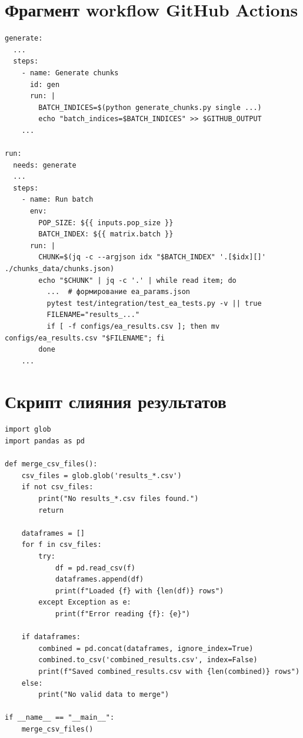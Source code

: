 \documentclass[732]{studrep}
\theoremstyle{nonumberplain}
\begin{document}
\section{Фрагмент workflow GitHub Actions}
\begin{listing}[H]
\begin{verbatim}
generate:
  ...
  steps:
    - name: Generate chunks
      id: gen
      run: |
        BATCH_INDICES=$(python generate_chunks.py single ...)
        echo "batch_indices=$BATCH_INDICES" >> $GITHUB_OUTPUT
    ...

run:
  needs: generate
  ...
  steps:
    - name: Run batch
      env:
        POP_SIZE: ${{ inputs.pop_size }}
        BATCH_INDEX: ${{ matrix.batch }}
      run: |
        CHUNK=$(jq -c --argjson idx "$BATCH_INDEX" '.[$idx][]' ./chunks_data/chunks.json)
        echo "$CHUNK" | jq -c '.' | while read item; do
          ...  # формирование ea_params.json
          pytest test/integration/test_ea_tests.py -v || true
          FILENAME="results_..."
          if [ -f configs/ea_results.csv ]; then mv configs/ea_results.csv "$FILENAME"; fi
        done
    ...
\end{verbatim}
\caption{Фрагмент workflow, реализующий генерацию чанков и параллельное выполнение тестов (стандартные шаги настройки окружения опущены).}
\label{lst:workflow_batch}
\end{listing}

\section{Скрипт слияния результатов}
\begin{listing}[H]
\begin{verbatim}
import glob
import pandas as pd

def merge_csv_files():
    csv_files = glob.glob('results_*.csv')
    if not csv_files:
        print("No results_*.csv files found.")
        return

    dataframes = []
    for f in csv_files:
        try:
            df = pd.read_csv(f)
            dataframes.append(df)
            print(f"Loaded {f} with {len(df)} rows")
        except Exception as e:
            print(f"Error reading {f}: {e}")

    if dataframes:
        combined = pd.concat(dataframes, ignore_index=True)
        combined.to_csv('combined_results.csv', index=False)
        print(f"Saved combined_results.csv with {len(combined)} rows")
    else:
        print("No valid data to merge")

if __name__ == "__main__":
    merge_csv_files()
\end{verbatim}
\caption{Скрипт слияния результатов \texttt{merge-csv.py}.}
\label{lst:merge_csv}
\end{listing}
\end{document}
